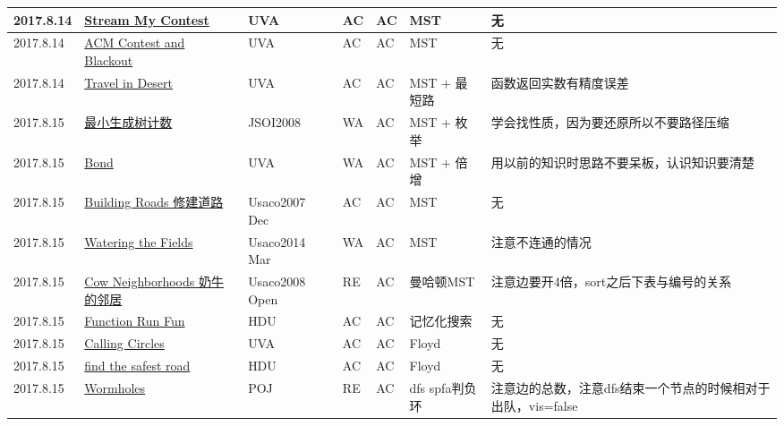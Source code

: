 \documentclass[a4paper]{article}
\begin{document}
\begin{longtable}{|p{1.5cm}|p{2.5cm}|p{1.6cm}|p{1.6cm}|p{1cm}|p{3cm}|p{4cm}|}
		\hline
		2017.8.14 & \href {https://vjudge.net/problem/UVA-11865}{Stream My Contest}
		 & UVA & AC & AC & MST & 无\\
		
		\hline
		2017.8.14 & \href {https://vjudge.net/problem/UVA-10600}{ACM Contest and Blackout}
		 & UVA & AC & AC & MST & 无\\
		
		\hline
		2017.8.14 & \href {https://vjudge.net/problem/UVA-10816}{Travel in Desert}
		 & UVA & AC & AC & MST + 最短路 & 函数返回实数有精度误差\\
		
		\hline
		2017.8.15 & \href {http://www.lydsy.com/JudgeOnline/problem.php?id=1016}{最小生成树计数}
		 & JSOI2008 & WA & AC & MST + 枚举 & 学会找性质，因为要还原所以不要路径压缩\\
		
		\hline
		2017.8.15 & \href {https://cn.vjudge.net/problem/UVA-11354}{Bond}
		 & UVA & WA & AC & MST + 倍增 & 用以前的知识时思路不要呆板，认识知识要清楚\\
		
		\hline
		2017.8.15 & \href {http://www.lydsy.com/JudgeOnline/problem.php?id=1626}{Building Roads 修建道路}
		 & Usaco2007 Dec & AC & AC & MST & 无\\
		
		\hline
		2017.8.15 & \href {http://www.lydsy.com/JudgeOnline/problem.php?id=3479}{Watering the Fields}
		 & Usaco2014 Mar & WA & AC & MST & 注意不连通的情况\\
		
		\hline
		2017.8.15 & \href {http://www.lydsy.com/JudgeOnline/problem.php?id=1604}{Cow Neighborhoods 奶牛的邻居}
		 & Usaco2008 Open & RE & AC & 曼哈顿MST & 注意边要开4倍，sort之后下表与编号的关系\\
		
		\hline
		2017.8.15 & \href {https://vjudge.net/problem/HDU-1579}{Function Run Fun}
		 & HDU & AC & AC & 记忆化搜索 & 无\\
		
		\hline
		2017.8.15 & \href {https://cn.vjudge.net/problem/UVA-247}{Calling Circles}
		 & UVA & AC & AC & Floyd & 无\\
		
		\hline
		2017.8.15 & \href {https://cn.vjudge.net/problem/HDU-1596}{find the safest road}
		 & HDU & AC & AC & Floyd & 无\\
		
		\hline
		2017.8.15 & \href {https://cn.vjudge.net/problem/POJ-3259}{Wormholes}
		 & POJ & RE & AC & dfs spfa判负环 & 注意边的总数，注意dfs结束一个节点的时候相对于出队，vis=false\\
		

\end{longtable}
\end{document}
